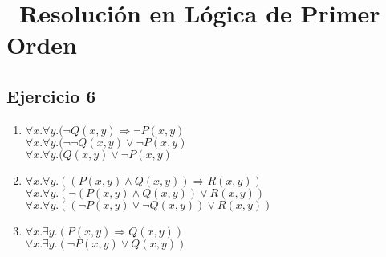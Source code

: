 \documentclass[10pt,a4paper]{article}
\begin{document}
\section*{\ Resolución en Lógica de Primer Orden}
  \subsection{Ejercicio 6}
    \begin{enumerate}
    \item $\forall x.  \forall y. ( \neg Q(x,y) \Rightarrow \neg P(x,y)$ \\
    $\forall x.  \forall y. ( \neg \neg Q(x,y) \vee \neg P(x,y)$ \\
    $\forall x.  \forall y. ( Q(x,y) \vee \neg P(x,y)$
    \item $\forall x.  \forall y. ((P(x,y) \wedge Q(x,y)) \Rightarrow R(x,y))$ \\
    $\forall x.  \forall y. (\neg (P(x,y) \wedge Q(x,y)) \vee R(x,y))$ \\
    $\forall x.  \forall y. ((\neg P(x,y) \vee \neg Q(x,y)) \vee R(x,y))$
    \item $\forall x.  \exists y. (P(x,y) \Rightarrow Q(x,y))$ \\
    $\forall x.  \exists y. (\neg P(x,y) \vee Q(x,y))$
    \end{enumerate}
\end{document}
